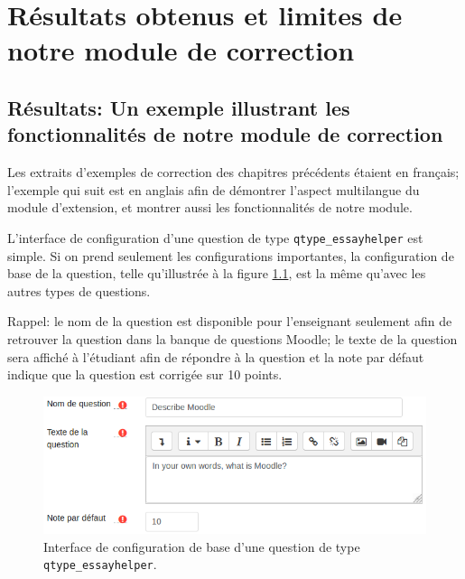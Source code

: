 \chapter{R\'esultats obtenus et limites de notre module de correction}

\section{R\'esultats: Un exemple illustrant les fonctionnalit\'es de notre module de correction}

Les extraits d'exemples de correction des chapitres pr\'ec\'edents \'etaient en fran\c{c}ais; l'exemple qui suit est en anglais afin de d\'emontrer l'aspect multilangue du module d'extension, et montrer aussi les fonctionnalit\'es de notre module.

L'interface de configuration d'une question de type \texttt{qtype\_essayhelper} est simple.
Si on prend seulement les configurations importantes, la configuration de base de la question, telle qu'illustr\'ee \`a la figure \ref{questionform_base}, est la m\^eme qu'avec les autres types de questions.

Rappel: le nom de la question est disponible pour l'enseignant seulement afin de retrouver la question dans la banque de questions Moodle; le texte de la question sera affich\'e \`a l'\'etudiant afin de r\'epondre \`a la question et la note par d\'efaut indique que la question est corrig\'ee sur 10 points.
\begin{figure}[htbp]
  \includegraphics[scale=0.85]{images/questionform_base.png}
  \caption{Interface de configuration de base d'une question de type \texttt{qtype\_essayhelper}.}
  \label{questionform_base}
\end{figure}

